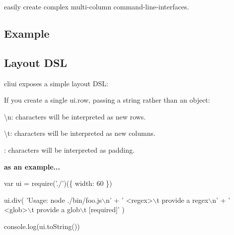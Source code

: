 \href{https://travis-ci.org/bcoe/cliui}{\tt } \href{https://coveralls.io/r/bcoe/cliui?branch=}{\tt } \href{https://www.npmjs.com/package/cliui}{\tt }

easily create complex multi-\/column command-\/line-\/interfaces.

\subsection*{Example}




\subsection*{Layout D\+SL}

cliui exposes a simple layout D\+SL\+:

If you create a single {\ttfamily ui.\+row}, passing a string rather than an object\+:


\begin{DoxyItemize}
\item {\ttfamily \textbackslash{}n}\+: characters will be interpreted as new rows.
\item {\ttfamily \textbackslash{}t}\+: characters will be interpreted as new columns.
\item \+: characters will be interpreted as padding.
\end{DoxyItemize}

{\bfseries as an example...}


\begin{DoxyCode}
var ui = require('./')(\{
  width: 60
\})

ui.div(
  'Usage: node ./bin/foo.js\(\backslash\)n' +
  '  <regex>\(\backslash\)t  provide a regex\(\backslash\)n' +
  '  <glob>\(\backslash\)t  provide a glob\(\backslash\)t [required]'
)

console.log(ui.toString())
\end{DoxyCode}


